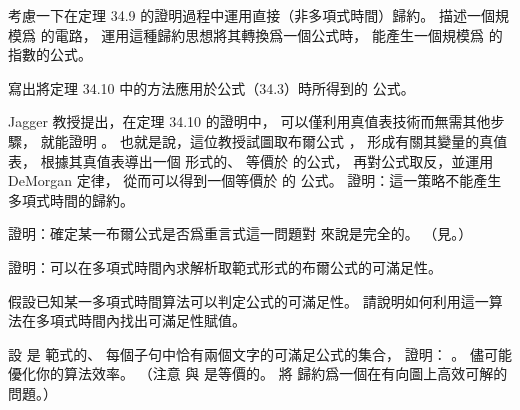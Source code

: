 \startsection[
  title={NP-completeness proofs},
]

\startEXERCISE
考慮一下在定理 34.9 的證明過程中運用直接（非多項式時間）歸約。
描述一個規模爲  的電路，
運用這種歸約思想將其轉換爲一個公式時，
能產生一個規模爲  的指數的公式。
\stopEXERCISE

\startANSWER
{}
\stopANSWER

\startEXERCISE
寫出將定理 34.10 中的方法應用於公式（34.3）時所得到的  公式。
\stopEXERCISE

\startANSWER
{}
\stopANSWER

\startEXERCISE
Jagger 教授提出，在定理 34.10 的證明中，
可以僅利用真值表技術而無需其他步驟，
就能證明 。
也就是說，這位教授試圖取布爾公式 \m{\phi}，
形成有關其變量的真值表，
根據其真值表導出一個  形式的、
等價於 \m{\neg \phi} 的公式，
再對公式取反，並運用 DeMorgan 定律，
從而可以得到一個等價於 \m{\phi} 的  公式。
證明：這一策略不能產生多項式時間的歸約。
\stopEXERCISE

\startANSWER
{}
\stopANSWER

\startEXERCISE
證明：確定某一布爾公式是否爲重言式這一問題對  來說是完全的。
（\hint 見。）
\stopEXERCISE

\startANSWER
{}
\stopANSWER

\startEXERCISE
證明：可以在多項式時間內求解析取範式形式的布爾公式的可滿足性。
\stopEXERCISE

\startANSWER
{}
\stopANSWER

\startEXERCISE
假設已知某一多項式時間算法可以判定公式的可滿足性。
請說明如何利用這一算法在多項式時間內找出可滿足性賦值。
\stopEXERCISE

\startANSWER
{}
\stopANSWER

\startEXERCISE
設  是  範式的、
每個子句中恰有兩個文字的可滿足公式的集合，
證明： 。
儘可能優化你的算法效率。
（\hint 注意  與  是等價的。
將  歸約爲一個在有向圖上高效可解的問題。）
\stopEXERCISE

\startANSWER
{}
\stopANSWER

\stopsection
